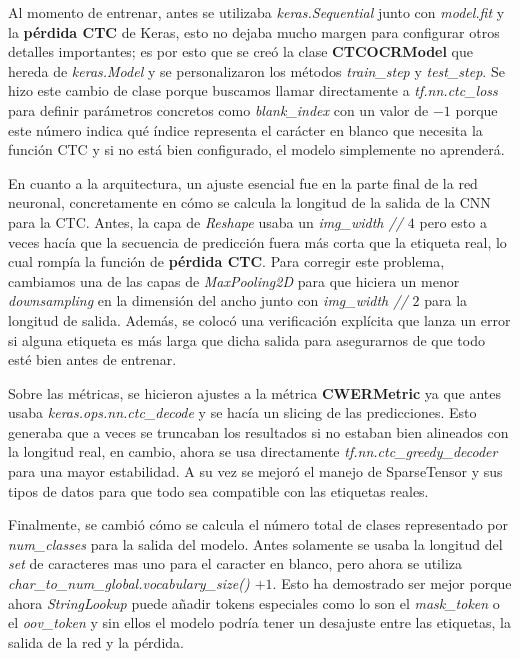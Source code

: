 \documentclass[10pt]{article}
\begin{document}
	Al momento de entrenar, antes se utilizaba \textit{keras.Sequential} junto con \textit{model.fit} y la \textbf{pérdida CTC} de Keras, esto no dejaba mucho margen para configurar otros detalles importantes; es por esto que se creó la clase \textbf{CTCOCRModel} que hereda de \textit{keras.Model} y se personalizaron los métodos \textit{train\_step} y \textit{test\_step}. Se hizo este cambio de clase porque buscamos llamar directamente a \textit{tf.nn.ctc\_loss} para definir parámetros concretos como \textit{blank\_index} con un valor de $-1$ porque este número indica qué índice representa el carácter en blanco que necesita la función CTC y si no está bien configurado, el modelo simplemente no aprenderá.
	
	En cuanto a la arquitectura, un ajuste esencial fue en la parte final de la red neuronal, concretamente en cómo se calcula la longitud de la salida de la CNN para la CTC. Antes, la capa de \textit{Reshape} usaba un \textit{img\_width // $4$} pero esto a veces hacía que la secuencia de predicción fuera más corta que la etiqueta real, lo cual rompía la función de \textbf{pérdida CTC}. Para corregir este problema, cambiamos una de las capas de \textit{MaxPooling2D} para que hiciera un menor \textit{downsampling} en la dimensión del ancho junto con \textit{img\_width // $2$} para la longitud de salida. Además, se colocó una verificación explícita que lanza un error si alguna etiqueta es más larga que dicha salida para asegurarnos de que todo esté bien antes de entrenar.
	
	Sobre las métricas, se hicieron ajustes a la métrica \textbf{CWERMetric} ya que antes usaba \textit{keras.ops.nn.ctc\_decode} y se hacía un slicing de las predicciones. Esto generaba que a veces se truncaban los resultados si no estaban bien alineados con la longitud real, en cambio, ahora se usa directamente \textit{tf.nn.ctc\_greedy\_decoder} para una mayor estabilidad. A su vez se mejoró el manejo de SparseTensor y sus tipos de datos para que todo sea compatible con las etiquetas reales.
	
	Finalmente, se cambió cómo se calcula el número total de clases representado por \textit{num\_classes} para la salida del modelo. Antes solamente se usaba la longitud del \textit{set} de caracteres mas uno para el caracter en blanco, pero ahora se utiliza \textit{char\_to\_num\_global.vocabulary\_size() $+ 1$}. Esto ha demostrado ser mejor porque ahora \textit{StringLookup} puede añadir tokens especiales como lo son el \textit{mask\_token} o el \textit{oov\_token} y sin ellos el modelo podría tener un desajuste entre las etiquetas, la salida de la red y la pérdida.
	
\end{document}
